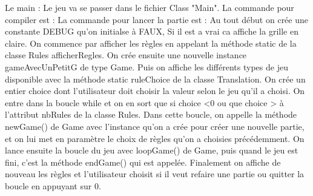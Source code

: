 Le main : Le jeu va se passer dans le fichier Class "Main".
La commande pour compiler est : 
La commande pour lancer la partie est :
Au tout début on crée une constante DEBUG qu'on initialse à FAUX, Si il est a vrai ca affiche la grille en claire.
On commence par afficher les règles en appelant la méthode static de la classe Rules
afficherRegles.
On crée ensuite une nouvelle instance gameAvecUnPetitG  de type Game.
Puis on affiche les différents types de jeu disponible avec la méthode static ruleChoice
de la classe Translation.
On crée un entier choice dont l'utilisateur doit choisir la valeur selon le jeu qu'il a choisi.
On entre dans la boucle while et on en sort que si choice <0 ou que choice > à l'attribut nbRules
de la classe Rules.
Dans cette boucle, on appelle la méthode newGame() de Game avec l'instance qu'on a crée pour créer une nouvelle partie, et on lui met en paramètre le choix de règles qu'on a choisies précédemment.
On lance ensuite la boucle du jeu avec loopGame() de Game, puis quand le jeu est fini, c'est la méthode endGame() qui est appelée.
Finalement on affiche de nouveau les règles et l'utilisateur choisit si il veut refaire une partie ou quitter la boucle en appuyant sur 0.